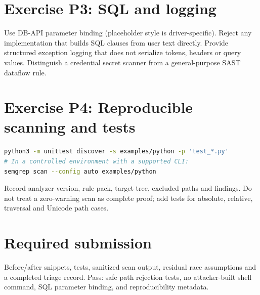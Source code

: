 \documentclass[10pt,letterpaper]{article}
\begin{document}
\section{Exercise P3: SQL and logging}
Use DB-API parameter binding (placeholder style is driver-specific). Reject any implementation that builds SQL clauses from user text directly. Provide structured exception logging that does not serialize tokens, headers or query values. Distinguish a credential secret scanner from a general-purpose SAST dataflow rule.
\section{Exercise P4: Reproducible scanning and tests}
\begin{lstlisting}[language=bash]
python3 -m unittest discover -s examples/python -p 'test_*.py'
# In a controlled environment with a supported CLI:
semgrep scan --config auto examples/python
\end{lstlisting}
Record analyzer version, rule pack, target tree, excluded paths and findings. Do not treat a zero-warning scan as complete proof; add tests for absolute, relative, traversal and Unicode path cases.
\section{Required submission}
Before/after snippets, tests, sanitized scan output, residual race assumptions and a completed triage record. Pass: safe path rejection tests, no attacker-built shell command, SQL parameter binding, and reproducibility metadata.
\end{document}
